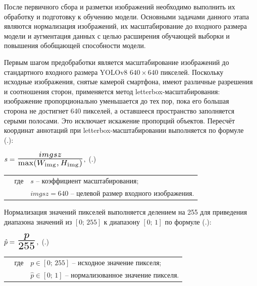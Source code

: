 {\gostFont

  \par \redline После первичного сбора и разметки изображений необходимо выполнить их обработку и подготовку к обучению модели. Основными задачами данного этапа являются нормализация изображений, их масштабирование до входного размера модели и аугментация данных с целью расширения обучающей выборки и повышения обобщающей способности модели.

  \par \redline Первым шагом предобработки является масштабирование изображений до стандартного входного размера YOLOv8 $640 \times 640$ пикселей. Поскольку исходные изображения, снятые камерой смартфона, имеют различные разрешения и соотношения сторон, применяется метод letterbox-масштабирования: изображение пропорционально уменьшается до тех пор, пока его большая сторона не достигнет 640 пикселей, а оставшееся пространство заполняется серыми полосами. Это исключает искажение пропорций объектов. Пересчёт координат аннотаций при letterbox-масштабировании выполняется по формуле (\thechaptercntr .\theformulacntr):

  \formulaspace 
  \par \redline $s = \scaleto{\frac{imgsz}{\max(W_{\mathrm{img}},\, H_{\mathrm{img}})}}{22pt},$
  \hfill (\thechaptercntr .\theformulacntr) \hspace*{-0.5cm}\redline
  \formulaspace \addtocounter{formulacntr}{1}

  \begin{tabular}{p{0.875cm}p{0.3cm}p{15.175cm}}
      & где  & $s$ {--} коэффициент масштабирования; \\
      &      & $imgsz = 640$ {--} целевой размер входного изображения. \\
  \end{tabular}
  \vspace{13pt}

  \par \redline Нормализация значений пикселей выполняется делением на 255 для приведения диапазона значений из $[0;\,255]$ к диапазону $[0;\,1]$ по формуле (\thechaptercntr .\theformulacntr):

  \formulaspace 
  \par \redline $\hat{p} = \scaleto{\frac{p}{255}}{22pt},$
  \hfill (\thechaptercntr .\theformulacntr) \hspace*{-0.5cm}\redline
  \formulaspace \addtocounter{formulacntr}{1}

  \begin{tabular}{p{0.875cm}p{0.3cm}p{15.175cm}}
      & где  & $p \in [0;\,255]$ {--} исходное значение пикселя; \\
      &      & $\hat{p} \in [0;\,1]$ {--} нормализованное значение пикселя. \\
  \end{tabular}
  \vspace{13pt}

}
